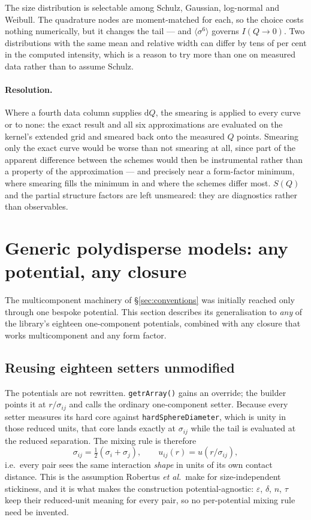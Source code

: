 \documentclass[11pt,a4paper]{article}
\newcommand{\code}[1]{\texttt{\hspace{0pt}#1}}
\begin{document}
The size distribution is selectable among Schulz, Gaussian, log-normal and
Weibull. The quadrature nodes are moment-matched for each, so the choice costs
nothing numerically, but it changes the tail --- and $\langle\sigma^6\rangle$
governs $I(Q\to0)$. Two distributions with the same mean and relative width
can differ by tens of per cent in the computed intensity, which is a reason to
try more than one on measured data rather than to assume Schulz.

\paragraph{Resolution.} Where a fourth data column supplies $\mathrm{d}Q$, the
smearing is applied to every curve or to none: the exact result and all six
approximations are evaluated on the kernel's extended grid and smeared back
onto the measured $Q$ points. Smearing only the exact curve would be worse
than not smearing at all, since part of the apparent difference between the
schemes would then be instrumental rather than a property of the
approximation --- and precisely near a form-factor minimum, where smearing
fills the minimum in and where the schemes differ most. $S(Q)$ and the partial
structure factors are left unsmeared: they are diagnostics rather than
observables.


\section{Generic polydisperse models: any potential, any closure}
\label{sec:generic}

The multicomponent machinery of \S\ref{sec:conventions} was initially reached
only through one bespoke potential. This section describes its generalisation
to \emph{any} of the library's eighteen one-component potentials, combined
with any closure that works multicomponent and any form factor.

\subsection{Reusing eighteen setters unmodified}

The potentials are not rewritten. \code{getrArray()} gains an override; the
builder points it at $r/\sigma_{ij}$ and calls the ordinary one-component
setter. Because every setter measures its hard core against
\code{hardSphereDiameter}, which is unity in those reduced units, that core
lands exactly at $\sigma_{ij}$ while the tail is evaluated at the reduced
separation. The mixing rule is therefore
\begin{equation}
\sigma_{ij}=\tfrac12(\sigma_i+\sigma_j),
\qquad
u_{ij}(r) = u\!\left(r/\sigma_{ij}\right),
\label{eq:reducedtail}
\end{equation}
i.e.\ every pair sees the same interaction \emph{shape} in units of its own
contact distance. This is the assumption Robertus \emph{et al.}\ make for
size-independent stickiness, and it is what makes the construction
potential-agnostic: $\varepsilon$, $\delta$, $n$, $\tau$ keep their
reduced-unit meaning for every pair, so no per-potential mixing rule need be
invented.
\end{document}
